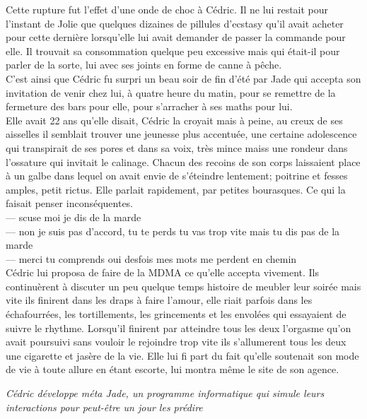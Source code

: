 \documentclass{article}
\begin{document}
Cette rupture fut l'effet d'une onde de choc à Cédric. Il ne lui restait pour
l'instant de Jolie que quelques dizaines de pillules d'ecstasy qu'il avait
acheter pour cette dernière lorsqu'elle lui avait demander de passer la commande pour
elle. Il trouvait sa consommation quelque peu excessive mais qui était-il pour
parler de la sorte, lui avec ses joints en forme de canne à pêche.\\

C'est ainsi que Cédric fu surpri un beau soir de fin d'été par Jade qui accepta
son invitation de venir chez lui, à quatre heure du matin, pour se remettre de
la fermeture des bars pour elle, pour s'arracher à ses maths pour lui.\\

Elle avait 22 ans qu'elle disait, Cédric la croyait mais à peine, au creux de
ses aisselles il semblait trouver une jeunesse plus accentuée, une certaine
adolescence qui transpirait de ses pores et dans sa voix, très mince maiss une
rondeur dans l'ossature qui invitait le calinage. Chacun des recoins de son
corps laissaient place à un galbe dans lequel on avait envie de s'éteindre
lentement; poitrine et fesses amples, petit rictus. Elle parlait rapidement,
par petites bourasques. Ce qui la faisait penser inconséquentes.\\

--- scuse moi je dis de la marde \\
--- non je suis pas d'accord, tu te perds tu vas trop vite mais tu dis pas de la marde\\
--- merci tu comprends oui desfois mes mots me perdent en chemin\\

Cédric lui proposa de faire de la MDMA ce qu'elle accepta vivement. Ils
continuèrent à discuter un peu quelque temps histoire de meubler leur soirée
mais vite ils finirent dans les draps à faire l'amour, elle riait parfois dans
les échafourrées, les tortillements, les grincements et les envolées qui
essayaient de suivre le rhythme. Lorsqu'il finirent par atteindre tous les deux
l'orgasme qu'on avait poursuivi sans vouloir le rejoindre trop vite ils
s'allumerent tous les deux une cigarette et jasère de la vie. Elle lui fi part
du fait qu'elle soutenait son mode de vie à toute allure en étant escorte, lui
montra même le site de son agence.


\textit{Cédric développe méta Jade, un programme informatique qui simule leurs interactions
pour peut-être un jour les prédire}
\end{document}
